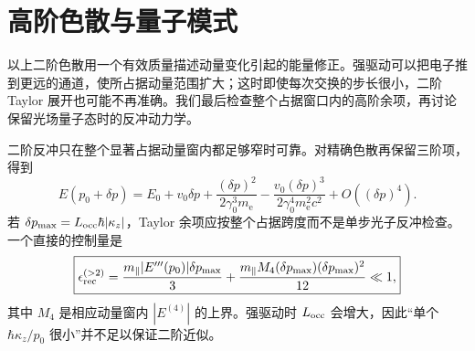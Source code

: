 


\section{高阶色散与量子模式}\label{subsec:higher-dispersion-quantum-mode-dp19}

以上二阶色散用一个有效质量描述动量变化引起的能量修正。强驱动可以把电子推到更远的通道，使所占据动量范围扩大；这时即使每次交换的步长很小，二阶 Taylor 展开也可能不再准确。我们最后检查整个占据窗口内的高阶余项，再讨论保留光场量子态时的反冲动力学。

二阶反冲只在整个显著占据动量窗内都足够窄时可靠。对精确色散再保留三阶项，得到
\begin{equation}
E(p_0+\delta p)
=E_0+v_0\delta p
+\frac{(\delta p)^2}{2\gamma_0^3m_{\mathrm e}}
-\frac{v_0(\delta p)^3}{2\gamma_0^4m_{\mathrm e}^2c^2}
+O((\delta p)^4).
\label{eq:dispersion_to_cubic}
\end{equation}
若 $\delta p_{\max}=L_{\rm occ}\hbar|\kappa_z|$，Taylor 余项应按整个占据跨度而不是单步光子反冲检查。一个直接的控制量是
\begin{equation}
\boxed{
\epsilon_{\rm rec}^{(>2)}
=\frac{m_\parallel|E'''(p_0)|\delta p_{\max}}{3}
+\frac{m_\parallel M_4(\delta p_{\max})(\delta p_{\max})^2}{12}
\ll1,}
\label{eq:recoil_taylor_remainder_control}
\end{equation}
其中 $M_4$ 是相应动量窗内 $|E^{(4)}|$ 的上界。强驱动时 $L_{\rm occ}$ 会增大，因此“单个 $\hbar \kappa_z/p_0$ 很小”并不足以保证二阶近似。

